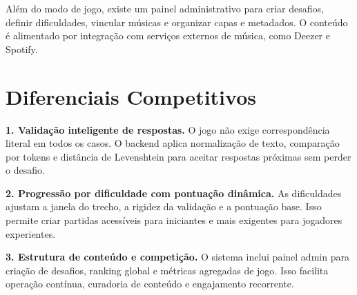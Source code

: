 \documentclass[12pt,a4paper]{article}
\begin{document}
Além do modo de jogo, existe um painel administrativo para criar desafios, definir dificuldades, vincular músicas e organizar capas e metadados. O conteúdo é alimentado por integração com serviços externos de música, como Deezer e Spotify.

\section*{Diferenciais Competitivos}
\textbf{1. Validação inteligente de respostas.} O jogo não exige correspondência literal em todos os casos. O backend aplica normalização de texto, comparação por tokens e distância de Levenshtein para aceitar respostas próximas sem perder o desafio.

\textbf{2. Progressão por dificuldade com pontuação dinâmica.} As dificuldades ajustam a janela do trecho, a rigidez da validação e a pontuação base. Isso permite criar partidas acessíveis para iniciantes e mais exigentes para jogadores experientes.

\textbf{3. Estrutura de conteúdo e competição.} O sistema inclui painel admin para criação de desafios, ranking global e métricas agregadas de jogo. Isso facilita operação contínua, curadoria de conteúdo e engajamento recorrente.
\end{document}
